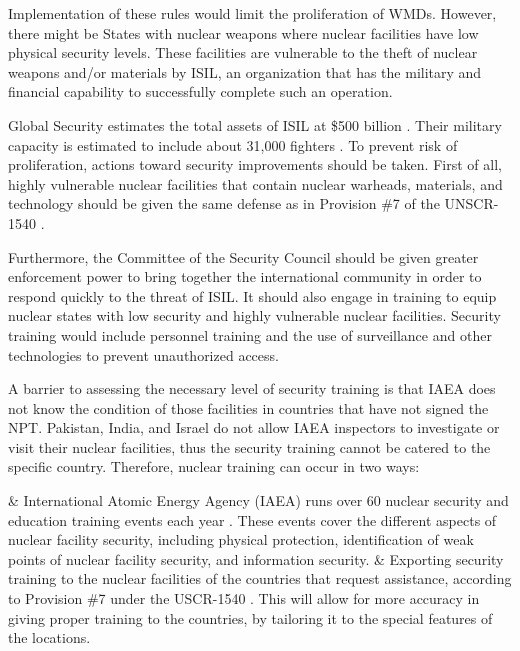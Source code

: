 \documentclass{report}
\begin{document}

Implementation of these rules would limit the proliferation of WMDs. However, there might be States with nuclear weapons where nuclear facilities have low physical security levels. These facilities are vulnerable to the theft of nuclear weapons and/or materials by ISIL, an organization that has the military and financial capability to successfully complete such an operation.

Global Security estimates the total assets of ISIL at \$500 billion \cite{GlobalSecurity}. Their  military capacity is estimated to include about 31,000 fighters \cite{BBC2014}. To prevent risk of proliferation, actions toward security improvements should be taken. First of all, highly vulnerable nuclear facilities that contain nuclear warheads, materials, and technology should be given the same defense as in Provision \#7 of the UNSCR-1540 \cite{Gomes2007a}. 

Furthermore, the Committee of the Security Council should be given greater enforcement power to bring together the international community in order to respond quickly to the threat of ISIL. It should also engage in training  to equip nuclear states with low security and highly vulnerable nuclear facilities. Security training would include personnel training and the use of surveillance and other technologies to prevent  unauthorized access. 

A barrier to assessing the necessary level of security training  is that IAEA does not know the condition of those facilities in countries that have not signed the NPT. Pakistan, India, and Israel do not allow IAEA inspectors to investigate or visit their nuclear facilities, thus the security training cannot be catered to the specific country.  Therefore, nuclear training can occur in two ways:


\begin{easylist}[enumerate]
& International Atomic Energy Agency (IAEA) runs over 60 nuclear security and education training events each year \cite{InternationalAtomicEnergyAgency2014}. These events cover the different aspects of nuclear facility security, including physical protection, identification of weak points of nuclear facility security, and information security.
& Exporting security training to the nuclear facilities of the countries that request assistance, according to Provision \#7 under the USCR-1540 \cite{Gomes2007a}. This will allow for more accuracy in giving proper training to the countries, by tailoring it to the special features of the locations.
\end{easylist}
\end{document}
